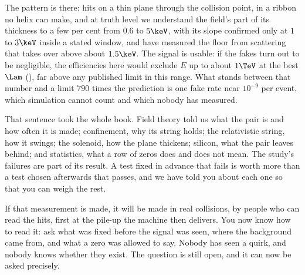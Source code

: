 The pattern is there: hits on a thin plane through the collision point, in a ribbon no helix can make, and at truth level we understand the field's part of its thickness to a few per cent from $0.6$ to $5\keV$, with its slope confirmed only at $1$ to $3\keV$ inside a stated window, and have measured the floor from scattering that takes over above about $1.5\keV$. The signal is usable: if the fakes turn out to be negligible, the efficiencies here would exclude $E$ up to about $1\TeV$ at the best $\Lam$ (\EST), far above any published limit in this range. What stands between that number and a limit $790$ times the prediction is one fake rate near $10^{-9}$ per event, which simulation cannot count and which nobody has measured.

That sentence took the whole book. Field theory told us what the pair is and how often it is made; confinement, why its string holds; the relativistic string, how it swings; the solenoid, how the plane thickens; silicon, what the pair leaves behind; and statistics, what a row of zeros does and does not mean. The study's failures are part of its result. A test fixed in advance that fails is worth more than a test chosen afterwards that passes, and we have told you about each one so that you can weigh the rest.

If that measurement is made, it will be made in real collisions, by people who can read the hits, first at the pile-up the machine then delivers. You now know how to read it: ask what was fixed before the signal was seen, where the background came from, and what a zero was allowed to say. Nobody has seen a quirk, and nobody knows whether they exist. The question is still open, and it can now be asked precisely.


